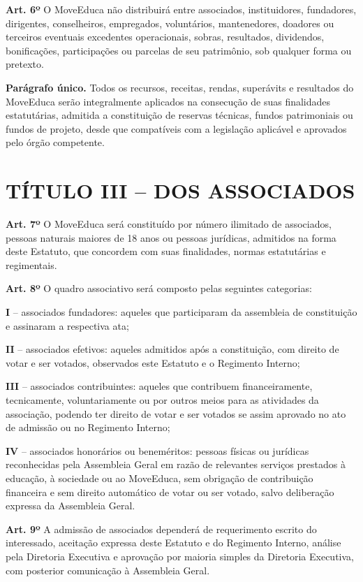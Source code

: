 \documentclass[11pt,a4paper]{article}
\begin{document}
\textbf{Art. 6º} O MoveEduca não distribuirá entre associados, instituidores, fundadores, dirigentes, conselheiros, empregados, voluntários, mantenedores, doadores ou terceiros eventuais excedentes operacionais, sobras, resultados, dividendos, bonificações, participações ou parcelas de seu patrimônio, sob qualquer forma ou pretexto.

\textbf{Parágrafo único.} Todos os recursos, receitas, rendas, superávits e resultados do MoveEduca serão integralmente aplicados na consecução de suas finalidades estatutárias, admitida a constituição de reservas técnicas, fundos patrimoniais ou fundos de projeto, desde que compatíveis com a legislação aplicável e aprovados pelo órgão competente.

\section*{TÍTULO III -- DOS ASSOCIADOS}

\textbf{Art. 7º} O MoveEduca será constituído por número ilimitado de associados, pessoas naturais maiores de 18 anos ou pessoas jurídicas, admitidos na forma deste Estatuto, que concordem com suas finalidades, normas estatutárias e regimentais.

\textbf{Art. 8º} O quadro associativo será composto pelas seguintes categorias:

\textbf{I} -- associados fundadores: aqueles que participaram da assembleia de constituição e assinaram a respectiva ata;

\textbf{II} -- associados efetivos: aqueles admitidos após a constituição, com direito de votar e ser votados, observados este Estatuto e o Regimento Interno;

\textbf{III} -- associados contribuintes: aqueles que contribuem financeiramente, tecnicamente, voluntariamente ou por outros meios para as atividades da associação, podendo ter direito de votar e ser votados se assim aprovado no ato de admissão ou no Regimento Interno;

\textbf{IV} -- associados honorários ou beneméritos: pessoas físicas ou jurídicas reconhecidas pela Assembleia Geral em razão de relevantes serviços prestados à educação, à sociedade ou ao MoveEduca, sem obrigação de contribuição financeira e sem direito automático de votar ou ser votado, salvo deliberação expressa da Assembleia Geral.

\textbf{Art. 9º} A admissão de associados dependerá de requerimento escrito do interessado, aceitação expressa deste Estatuto e do Regimento Interno, análise pela Diretoria Executiva e aprovação por maioria simples da Diretoria Executiva, com posterior comunicação à Assembleia Geral.
\end{document}
